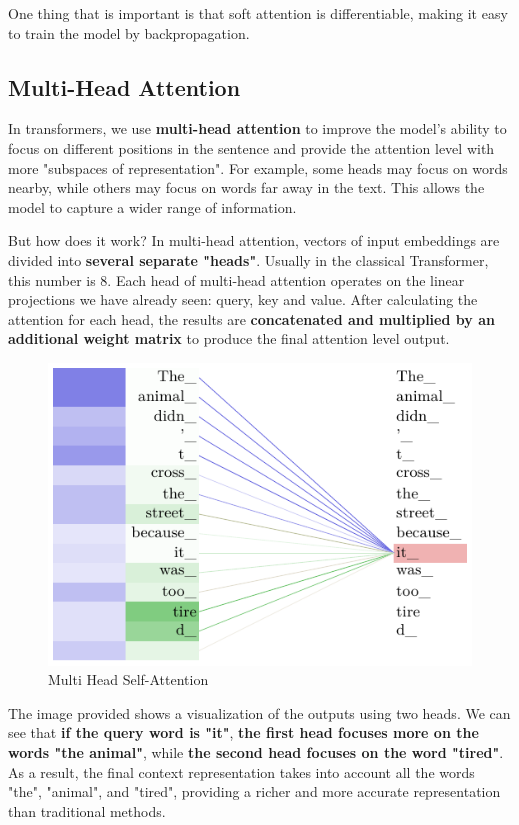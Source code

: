 One thing that is important is that soft attention is differentiable, making it easy to train the model by backpropagation.


\subsection{Multi-Head Attention}
In transformers, we use \textbf{multi-head attention} to improve the model's ability to focus on different positions in the sentence and provide the attention level with more "subspaces of representation". For example, some heads may focus on words nearby, while others may focus on words far away in the text. This allows the model to capture a wider range of information.

But how does it work? In multi-head attention, vectors of input embeddings are divided into \textbf{several separate "heads"}. Usually in the classical Transformer, this number is 8. Each head of multi-head attention operates on the linear projections we have already seen: query, key and value. After calculating the attention for each head, the results are \textbf{concatenated and multiplied by an additional weight matrix} to produce the final attention level output.

\begin{figure}[!htbp]
    \centering
    \includegraphics[width=0.8\linewidth]{tikz/chapter8 - Multi Head Self-Attention.pdf}
    \caption{Multi Head Self-Attention}
\end{figure}

The image provided shows a visualization of the outputs using two heads. We can see that \textbf{\textcolor{myred}{if the query word is "it"}}, \textbf{\textcolor{myblue}{the first head focuses more on the words "the animal"}}, while \textbf{\textcolor{mygreen}{the second head focuses on the word "tired"}}. As a result, the final context representation takes into account all the words "the", "animal", and "tired", providing a richer and more accurate representation than traditional methods.



